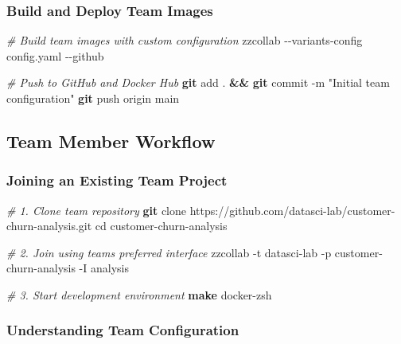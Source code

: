 \documentclass[
]{article}
\newenvironment{Shaded}{\begin{snugshade}}{\end{snugshade}}
\newcommand{\AttributeTok}[1]{\textcolor[rgb]{0.13,0.29,0.53}{#1}}
\newcommand{\BuiltInTok}[1]{#1}
\newcommand{\CommentTok}[1]{\textcolor[rgb]{0.56,0.35,0.01}{\textit{#1}}}
\newcommand{\ExtensionTok}[1]{#1}
\newcommand{\FunctionTok}[1]{\textcolor[rgb]{0.13,0.29,0.53}{\textbf{#1}}}
\newcommand{\KeywordTok}[1]{\textcolor[rgb]{0.13,0.29,0.53}{\textbf{#1}}}
\newcommand{\NormalTok}[1]{#1}
\newcommand{\StringTok}[1]{\textcolor[rgb]{0.31,0.60,0.02}{#1}}
\begin{document}
\subsubsection{Build and Deploy Team
Images}\label{build-and-deploy-team-images}

\begin{Shaded}
\begin{Highlighting}[]
\CommentTok{\# Build team images with custom configuration}
\ExtensionTok{zzcollab} \AttributeTok{{-}{-}variants{-}config}\NormalTok{ config.yaml }\AttributeTok{{-}{-}github}

\CommentTok{\# Push to GitHub and Docker Hub}
\FunctionTok{git}\NormalTok{ add . }\KeywordTok{\&\&} \FunctionTok{git}\NormalTok{ commit }\AttributeTok{{-}m} \StringTok{"Initial team configuration"}
\FunctionTok{git}\NormalTok{ push origin main}
\end{Highlighting}
\end{Shaded}

\subsection{Team Member Workflow}\label{team-member-workflow}

\subsubsection{Joining an Existing Team
Project}\label{joining-an-existing-team-project}

\begin{Shaded}
\begin{Highlighting}[]
\CommentTok{\# 1. Clone team repository}
\FunctionTok{git}\NormalTok{ clone https://github.com/datasci{-}lab/customer{-}churn{-}analysis.git}
\BuiltInTok{cd}\NormalTok{ customer{-}churn{-}analysis}

\CommentTok{\# 2. Join using team\textquotesingle{}s preferred interface}
\ExtensionTok{zzcollab} \AttributeTok{{-}t}\NormalTok{ datasci{-}lab }\AttributeTok{{-}p}\NormalTok{ customer{-}churn{-}analysis }\AttributeTok{{-}I}\NormalTok{ analysis}

\CommentTok{\# 3. Start development environment}
\FunctionTok{make}\NormalTok{ docker{-}zsh}
\end{Highlighting}
\end{Shaded}

\subsubsection{Understanding Team
Configuration}\label{understanding-team-configuration}
\end{document}
